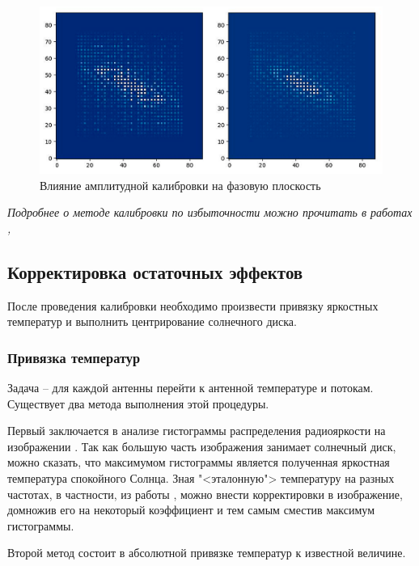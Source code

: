 \begin{figure}[H]
	\centering
	\includegraphics[width=1\linewidth]{images/amplitude_notcalib_and_calib}
	\caption{Влияние амплитудной калибровки на фазовую плоскость}
	\label{fig:amplitude_notcalib_and_calib}
\end{figure}

\noindent\textit{Подробнее о методе калибровки по избыточности можно прочитать в работах \cite{Wieringa}, \cite{Liu}}

\subsection{Корректировка остаточных эффектов}
После проведения калибровки необходимо произвести привязку яркостных температур и выполнить центрирование солнечного диска.

\subsubsection{Привязка температур}
Задача -- для каждой антенны перейти к антенной температуре и потокам. Существует два метода выполнения этой процедуры.

Первый заключается в анализе гистограммы распределения радиояркости на изображении \cite{trees}. Так как большую часть изображения занимает солнечный диск, можно сказать, что максимумом гистограммы является полученная яркостная температура спокойного Солнца. Зная "<эталонную"> температуру на разных частотах, в частности, из работы \cite{Zirin}, можно внести корректировки в изображение, домножив его на некоторый коэффициент и тем самым сместив максимум гистограммы.

Второй метод состоит в абсолютной привязке температур к известной величине.

